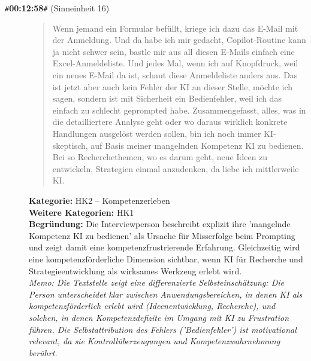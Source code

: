 \begin{description}
  \item[\texttt{\#}\textbf{00:12:58}\texttt{\#} (Sinneinheit 16)]
  \begin{quote}
  Wenn jemand ein Formular befüllt, kriege ich dazu das E-Mail mit der Anmeldung. Und da habe ich mir gedacht, Copilot-Routine kann ja nicht schwer sein, bastle mir aus all diesen E-Mails einfach eine Excel-Anmeldeliste. Und jedes Mal, wenn ich auf Knopfdruck, weil ein neues E-Mail da ist, schaut diese Anmeldeliste anders aus. Das ist jetzt aber auch kein Fehler der KI an dieser Stelle, möchte ich sagen, sondern ist mit Sicherheit ein Bedienfehler, weil ich das einfach zu schlecht geprompted habe. Zusammengefasst, alles, was in die detailliertere Analyse geht oder wo daraus wirklich konkrete Handlungen ausgelöst werden sollen, bin ich noch immer KI-skeptisch, auf Basis meiner mangelnden Kompetenz KI zu bedienen. Bei so Recherchethemen, wo es darum geht, neue Ideen zu entwickeln, Strategien einmal anzudenken, da liebe ich mittlerweile KI.
  \end{quote}
  \textbf{Kategorie:} HK2 -- Kompetenzerleben\\
  \textbf{Weitere Kategorien:} HK1\\
  \textbf{Begr\"undung:} Die Interviewperson beschreibt explizit ihre 'mangelnde Kompetenz KI zu bedienen' als Ursache für Misserfolge beim Prompting und zeigt damit eine kompetenzfrustrierende Erfahrung. Gleichzeitig wird eine kompetenzförderliche Dimension sichtbar, wenn KI für Recherche und Strategieentwicklung als wirksames Werkzeug erlebt wird.
  \\\textit{Memo: Die Textstelle zeigt eine differenzierte Selbsteinschätzung: Die Person unterscheidet klar zwischen Anwendungsbereichen, in denen KI als kompetenzförderlich erlebt wird (Ideenentwicklung, Recherche), und solchen, in denen Kompetenzdefizite im Umgang mit KI zu Frustration führen. Die Selbstattribution des Fehlers ('Bedienfehler') ist motivational relevant, da sie Kontrollüberzeugungen und Kompetenzwahrnehmung berührt.}
\end{description}
\medskip

